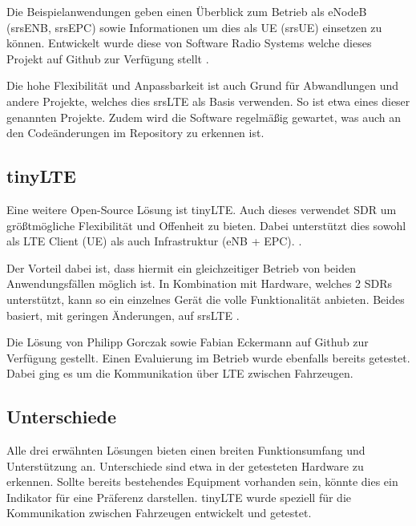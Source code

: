 Die Beispielanwendungen geben einen Überblick zum Betrieb als eNodeB (srsENB, srsEPC) sowie Informationen um dies als UE (srsUE) einsetzen zu können. Entwickelt wurde diese von Software Radio Systems welche dieses Projekt auf Github zur Verfügung stellt \cite{githubSrSLTE}.

Die hohe Flexibilität und Anpassbarkeit ist auch Grund für Abwandlungen und andere Projekte, welches dies srsLTE als Basis verwenden. So ist etwa  eines dieser genannten Projekte. Zudem wird die Software regelmäßig gewartet, was auch an den Codeänderungen im Repository zu erkennen ist. 

\subsection{tinyLTE}
\label{tinyLTE}
Eine weitere Open-Source Lösung ist tinyLTE. Auch dieses verwendet SDR um größtmögliche Flexibilität und Offenheit zu bieten. Dabei unterstützt dies sowohl als LTE Client (UE) als auch Infrastruktur (eNB + EPC). \cite{eckermann2018tinylte}.

Der Vorteil dabei ist, dass hiermit ein gleichzeitiger Betrieb von beiden Anwendungsfällen möglich ist. In Kombination mit Hardware, welches 2 SDRs unterstützt, kann so ein einzelnes Gerät die volle Funktionalität anbieten. 
Beides basiert, mit geringen Änderungen, auf srsLTE \cite{gomez2016srslte}. 

Die Lösung von Philipp Gorczak sowie Fabian Eckermann auf Github zur Verfügung gestellt. Einen Evaluierung im Betrieb wurde ebenfalls bereits getestet. Dabei ging es um die Kommunikation über LTE zwischen Fahrzeugen. 

\subsection{Unterschiede}
Alle drei erwähnten Lösungen bieten einen breiten Funktionsumfang und Unterstützung an. Unterschiede sind etwa in der getesteten Hardware zu erkennen. Sollte bereits bestehendes Equipment vorhanden sein, könnte dies ein Indikator für eine Präferenz darstellen. 
tinyLTE wurde speziell für die Kommunikation zwischen Fahrzeugen entwickelt und getestet. 